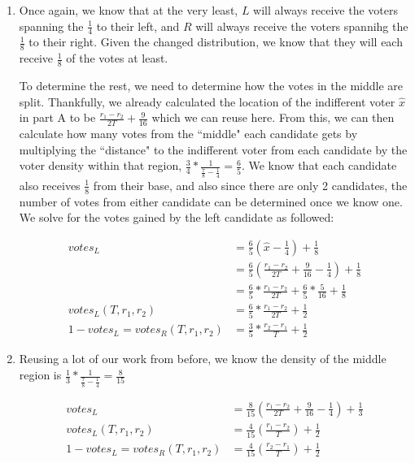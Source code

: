 \documentclass[12pt,letterpaper]{article}
\begin{document}
\begin{enumerate}
\begin{enumerate}
	\item Once again, we know that at the very least, $L$ will always receive the voters spanning the $\frac{1}{4}$ to their left, and $R$ will always receive the voters spannihg the $\frac{1}{8}$ to their right. Given the changed distribution, we know that they will each receive $\frac{1}{8}$ of the votes at least.
	
	To determine the rest, we need to determine how the votes in the middle are split. Thankfully, we already calculated the location of the indifferent voter $\hat{x}$ in part A to be $\frac{r_1 - r_2}{2T} + \frac{9}{16}$ which we can reuse here. From this, we can then calculate how many votes from the ``middle" each candidate gets by multiplying the ``distance" to the indifferent voter from each candidate by the voter density within that region, $\frac{3}{4} * \frac{1}{\frac{7}{8} - \frac{1}{4}} = \frac{6}{5}$. We know that each candidate also receives $\frac{1}{8}$ from their base, and also since there are only 2 candidates, the number of votes from either candidate can be determined once we know one. We solve for the votes gained by the left candidate as followed:

	\begin{align*}
		{votes}_L &= \frac{6}{5} (\hat{x} - \frac{1}{4}) + \frac{1}{8} \\
		&= \frac{6}{5} (\frac{r_1-r_2}{2T} + \frac{9}{16} - \frac{1}{4}) + \frac{1}{8} \\
		&= \frac{6}{5} * \frac{r_1 - r_2}{2T} + \frac{6}{5} * \frac{5}{16} + \frac{1}{8} \\
		{votes}_L(T,r_1, r_2) &= \frac{6}{5} * \frac{r_1 - r_2}{2T} + \frac{1}{2} \\
		1 - {votes}_L = {votes}_R(T,r_1, r_2) &= \frac{3}{5} * \frac{r_2 - r_1}{T} + \frac{1}{2}
	\end{align*}

	\item Reusing a lot of our work from before, we know the density of the middle region is $\frac{1}{3}* \frac{1}{\frac{7}{8} - \frac{1}{4}} = \frac{8}{15}$
	
	\begin{align*}
		{votes}_L &= \frac{8}{15} (\frac{r_1 - r_2}{2T} + \frac{9}{16} - \frac{1}{4}) + \frac{1}{3} \\
		{votes}_L(T,r_1, r_2) &= \frac{4}{15} (\frac{r_1 - r_2}{T}) + \frac{1}{2} \\
		1 - {votes}_L  = {votes}_R(T,r_1, r_2) &= \frac{4}{15} (\frac{r_2 - r_1}{T}) + \frac{1}{2}
	\end{align*}


\end{enumerate}
\end{enumerate}
\end{document}
